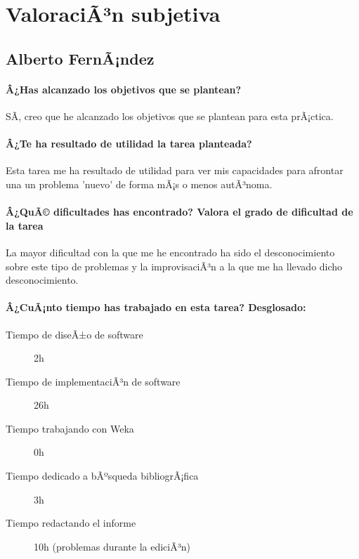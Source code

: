\documentclass[11pt, titlepage,a4paper]{article}
\begin{document}
\section{ValoraciÃ³n subjetiva}

\subsection{Alberto FernÃ¡ndez}
\paragraph{Â¿Has alcanzado los objetivos que se plantean?\\}
SÃ­, creo que he alcanzado los objetivos que se plantean para esta prÃ¡ctica.

\paragraph{Â¿Te ha resultado de utilidad la tarea planteada?\\}
Esta tarea me ha resultado de utilidad para ver mis capacidades para afrontar
una un problema 'nuevo' de forma mÃ¡s o menos autÃ³noma.

\paragraph{Â¿QuÃ© dificultades has encontrado? Valora el grado de dificultad de
la tarea\\}
La mayor dificultad con la que me he encontrado ha sido el desconocimiento sobre
este tipo de problemas y la improvisaciÃ³n a la que me ha llevado dicho desconocimiento.

\paragraph{Â¿CuÃ¡nto tiempo has trabajado en esta tarea? Desglosado:\\}
\begin{description}
	\item[Tiempo de diseÃ±o de software] 2h
	\item[Tiempo de implementaciÃ³n de software] 26h
	\item[Tiempo trabajando con Weka] 0h
	\item[Tiempo dedicado a bÃºsqueda bibliogrÃ¡fica] 3h
	\item[Tiempo redactando el informe] 10h (problemas durante la ediciÃ³n)
\end{description}
\end{document}
